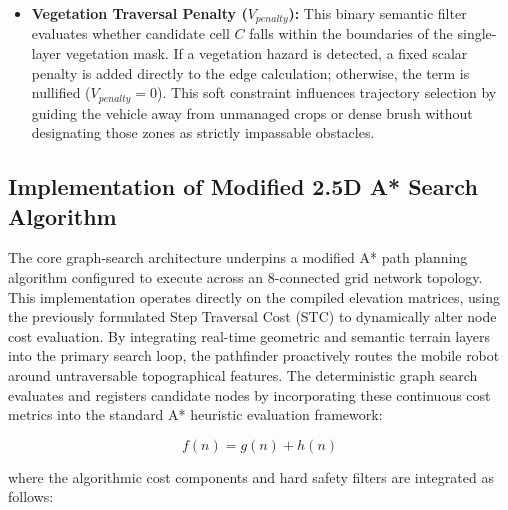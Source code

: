 \begin{itemize}
    \item \textbf{Vegetation Traversal Penalty ($V_{penalty}$):} This binary semantic filter evaluates whether candidate cell $C$ falls within the boundaries of the single-layer vegetation mask. If a vegetation hazard is detected, a fixed scalar penalty is added directly to the edge calculation; otherwise, the term is nullified ($V_{penalty} = 0$). This soft constraint influences trajectory selection by guiding the vehicle away from unmanaged crops or dense brush without designating those zones as strictly impassable obstacles.
\end{itemize}

\subsection{Implementation of Modified 2.5D A* Search Algorithm}

The core graph-search architecture underpins a modified A* path planning algorithm configured to
execute across an 8-connected grid network topology. This implementation operates directly on the
compiled elevation matrices, using the previously formulated Step Traversal Cost (STC) to
dynamically alter node cost evaluation. By integrating real-time geometric and semantic terrain
layers into the primary search loop, the pathfinder proactively routes the mobile robot around
untraversable topographical features. The deterministic graph search evaluates and registers
candidate nodes by incorporating these continuous cost metrics into the standard A* heuristic
evaluation framework:

\begin{equation}
    f(n) = g(n) + h(n)
\end{equation}

\noindent where the algorithmic cost components and hard safety filters are integrated as follows:

